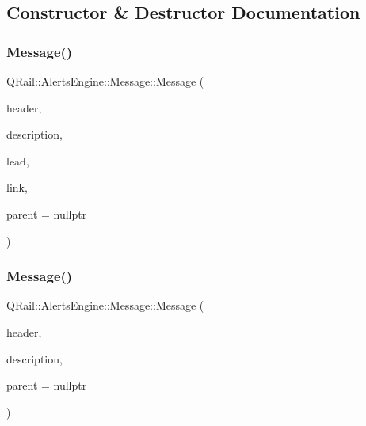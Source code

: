\subsection{Constructor \& Destructor Documentation}
\mbox{\label{classQRail_1_1AlertsEngine_1_1Message_a9867f44f407fac012b4a29299dac9717}} 
\subsubsection{\texorpdfstring{Message()}{Message()}\hspace{0.1cm}{\footnotesize\ttfamily [1/2]}}
{\footnotesize\ttfamily Q\+Rail\+::\+Alerts\+Engine\+::\+Message\+::\+Message (\begin{DoxyParamCaption}\item[{const Q\+String \&}]{header,  }\item[{const Q\+String \&}]{description,  }\item[{const Q\+String \&}]{lead,  }\item[{const Q\+Url \&}]{link,  }\item[{Q\+Object $\ast$}]{parent = {\ttfamily nullptr} }\end{DoxyParamCaption})\hspace{0.3cm}{\ttfamily [explicit]}}

\mbox{\label{classQRail_1_1AlertsEngine_1_1Message_a453a2731f60a132e3e4bb39e08dbcf4c}} 
\subsubsection{\texorpdfstring{Message()}{Message()}\hspace{0.1cm}{\footnotesize\ttfamily [2/2]}}
{\footnotesize\ttfamily Q\+Rail\+::\+Alerts\+Engine\+::\+Message\+::\+Message (\begin{DoxyParamCaption}\item[{const Q\+String \&}]{header,  }\item[{const Q\+String \&}]{description,  }\item[{Q\+Object $\ast$}]{parent = {\ttfamily nullptr} }\end{DoxyParamCaption})\hspace{0.3cm}{\ttfamily [explicit]}}



